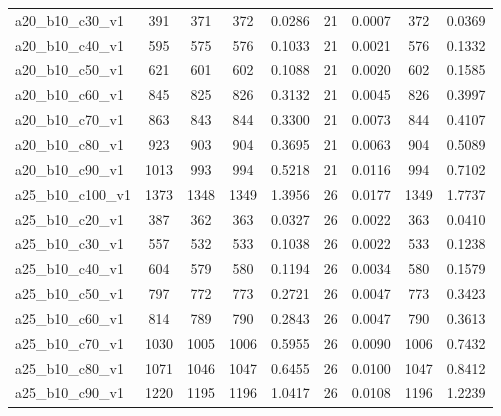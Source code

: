 \documentclass[11pt, a4paper]{article}
\begin{document}
\begin{table}[htbp]
{\begin{tabular}{@{} l cc ccc ccc @{}}
a20\_b10\_c30\_v1 & 391 & 371 & 372 & 0.0286 & 21 & 0.0007 & 372 & 0.0369 \\
a20\_b10\_c40\_v1 & 595 & 575 & 576 & 0.1033 & 21 & 0.0021 & 576 & 0.1332 \\
a20\_b10\_c50\_v1 & 621 & 601 & 602 & 0.1088 & 21 & 0.0020 & 602 & 0.1585 \\
a20\_b10\_c60\_v1 & 845 & 825 & 826 & 0.3132 & 21 & 0.0045 & 826 & 0.3997 \\
a20\_b10\_c70\_v1 & 863 & 843 & 844 & 0.3300 & 21 & 0.0073 & 844 & 0.4107 \\
a20\_b10\_c80\_v1 & 923 & 903 & 904 & 0.3695 & 21 & 0.0063 & 904 & 0.5089 \\
a20\_b10\_c90\_v1 & 1013 & 993 & 994 & 0.5218 & 21 & 0.0116 & 994 & 0.7102 \\
a25\_b10\_c100\_v1 & 1373 & 1348 & 1349 & 1.3956 & 26 & 0.0177 & 1349 & 1.7737 \\
a25\_b10\_c20\_v1 & 387 & 362 & 363 & 0.0327 & 26 & 0.0022 & 363 & 0.0410 \\
a25\_b10\_c30\_v1 & 557 & 532 & 533 & 0.1038 & 26 & 0.0022 & 533 & 0.1238 \\
a25\_b10\_c40\_v1 & 604 & 579 & 580 & 0.1194 & 26 & 0.0034 & 580 & 0.1579 \\
a25\_b10\_c50\_v1 & 797 & 772 & 773 & 0.2721 & 26 & 0.0047 & 773 & 0.3423 \\
a25\_b10\_c60\_v1 & 814 & 789 & 790 & 0.2843 & 26 & 0.0047 & 790 & 0.3613 \\
a25\_b10\_c70\_v1 & 1030 & 1005 & 1006 & 0.5955 & 26 & 0.0090 & 1006 & 0.7432 \\
a25\_b10\_c80\_v1 & 1071 & 1046 & 1047 & 0.6455 & 26 & 0.0100 & 1047 & 0.8412 \\
a25\_b10\_c90\_v1 & 1220 & 1195 & 1196 & 1.0417 & 26 & 0.0108 & 1196 & 1.2239 \\
    \bottomrule
  \end{tabular}
  } %
\end{table}
\end{document}
